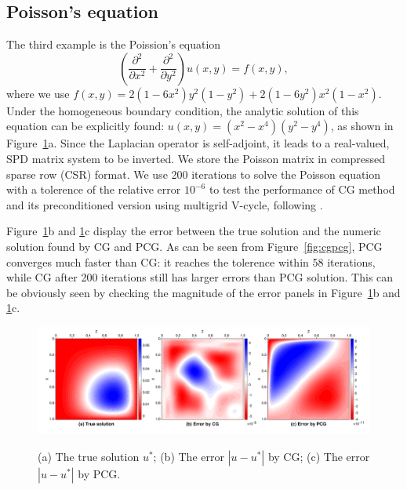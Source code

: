 \documentclass[10pt]{article}
\begin{document}
\subsection{Poisson's equation}

The third example is the Poission's equation
\begin{equation}
\left(\frac{\partial^2}{\partial x^2} + \frac{\partial^2}{\partial y^2}\right)u(x,y) = f(x,y),
\end{equation}
where we use $f(x,y) = 2(1-6x^2)y^2(1-y^2) + 2(1-6y^2)x^2(1-x^2)$. Under the homogeneous boundary condition, the analytic solution of this equation can be explicitly found: $u(x,y)=(x^2-x^4)(y^2-y^4)$, as shown in Figure~\ref{fig:poisson}a. Since the Laplacian operator is self-adjoint, it leads to a real-valued, SPD matrix system to be inverted. We store the Poisson matrix in compressed sparse row (CSR) format.
We use 200 iterations to solve the Poisson equation with a tolerence of the relative error $10^{-6}$ to test the performance of CG method and its preconditioned version using multigrid V-cycle, following \citep{Briggs_2000_Multigrid}.

Figure~\ref{fig:poisson}b and \ref{fig:poisson}c display the error between the true solution and the numeric solution found by CG and PCG. As can be seen from Figure~\ref{fig:cgpcg}, PCG converges much faster than CG: it reaches the tolerence within 58 iterations, while CG after 200 iterations still has larger errors than PCG solution. This can be obviously seen by checking the magnitude of the error panels in Figure~\ref{fig:poisson}b and \ref{fig:poisson}c. 

\begin{figure}
  \centering
  \includegraphics[width=\linewidth]{poisson.pdf}\label{fig:poisson}
  \caption{(a) The true solution $u^*$; (b) The error $|u-u^*|$ by CG; (c) The error $|u-u^*|$ by PCG.}
\end{figure}
\end{document}
